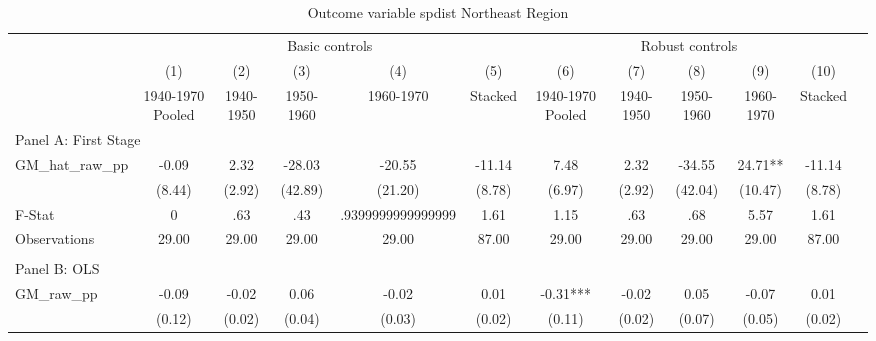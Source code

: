  \begin{table}[htbp]\centering {} \begin{threeparttable} \caption{Outcome variable spdist Northeast Region} \begin{tabular}{l*{11}{c}} \toprule
          &\multicolumn{5}{c}{Basic controls}                                   &\multicolumn{5}{c}{Robust controls}                                  \\\cmidrule(lr){2-6}\cmidrule(lr){7-11}
          &\multicolumn{1}{c}{(1)}&\multicolumn{1}{c}{(2)}&\multicolumn{1}{c}{(3)}&\multicolumn{1}{c}{(4)}&\multicolumn{1}{c}{(5)}&\multicolumn{1}{c}{(6)}&\multicolumn{1}{c}{(7)}&\multicolumn{1}{c}{(8)}&\multicolumn{1}{c}{(9)}&\multicolumn{1}{c}{(10)}\\
          &\multicolumn{1}{c}{1940-1970 Pooled}&\multicolumn{1}{c}{1940-1950}&\multicolumn{1}{c}{1950-1960}&\multicolumn{1}{c}{1960-1970}&\multicolumn{1}{c}{Stacked}&\multicolumn{1}{c}{1940-1970 Pooled}&\multicolumn{1}{c}{1940-1950}&\multicolumn{1}{c}{1950-1960}&\multicolumn{1}{c}{1960-1970}&\multicolumn{1}{c}{Stacked}\\
\cmidrule(lr){1-11}
\multicolumn{10}{l}{Panel A: First Stage}\\
\cmidrule(lr){1-11}
GM\_hat\_raw\_pp&     -0.09   &      2.32   &    -28.03   &    -20.55   &    -11.14   &      7.48   &      2.32   &    -34.55   &     24.71** &    -11.14   \\
          &    (8.44)   &    (2.92)   &   (42.89)   &   (21.20)   &    (8.78)   &    (6.97)   &    (2.92)   &   (42.04)   &   (10.47)   &    (8.78)   \\
\midrule
F-Stat    &         0   &       .63   &       .43   &.9399999999999999   &      1.61   &      1.15   &       .63   &       .68   &      5.57   &      1.61   \\
Observations&     29.00   &     29.00   &     29.00   &     29.00   &     87.00   &     29.00   &     29.00   &     29.00   &     29.00   &     87.00   \\
\cmidrule[\heavyrulewidth](lr){1-11} \\ \cmidrule[\heavyrulewidth](lr){1-11}
\multicolumn{10}{l}{Panel B: OLS}\\
\cmidrule(lr){1-11}
GM\_raw\_pp &     -0.09   &     -0.02   &      0.06   &     -0.02   &      0.01   &     -0.31***&     -0.02   &      0.05   &     -0.07   &      0.01   \\
          &    (0.12)   &    (0.02)   &    (0.04)   &    (0.03)   &    (0.02)   &    (0.11)   &    (0.02)   &    (0.07)   &    (0.05)   &    (0.02)   \\

\end{tabular}
\end{threeparttable}
\end{table}
